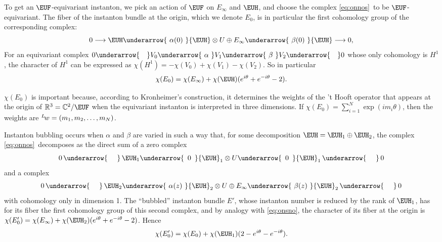 To get an ${\EUF}$-equivariant instanton, we pick an action of
${\EUF}$ on $E_\infty$ and ${{\EUH}}$, and choose the complex
\eqref{eq:onnos}\ to be ${\EUF}$-equivariant. The fiber of the instanton
bundle at the origin, which we denote $E_0$, is in particular the
first cohomology group of the corresponding complex:
\setcounter{equation}{7}
\begin{equation}\label{eq:otonos}
0\longrightarrow{{\EUH}}\underarrow{\,\,\alpha(0)\,\,}{{\EUH}}\otimes
U\oplus E_\infty\underarrow{\,\,\beta(0)\,\,}
{{\EUH}}\longrightarrow 0,
\end{equation}
 For an equivariant complex
$0\underarrow{~~~} V_0\underarrow{\,\,\alpha\,\,}
V_1\underarrow{\,\,\beta\,\,} V_2\underarrow{~~~} 0$ whose only
cohomology is $H^1$, the character of $H^1$ can be expressed as
$\chi(H^1)=-\chi(V_0)+\chi(V_1)-\chi(V_2)$. So in particular
\setcounter{equation}{8}
\begin{equation}\label{eq:onsno}
\chi(E_0)=\chi(E_\infty)+\chi({{\EUH}})(e^{i\theta}+e^{-i\theta}-2).
\end{equation}

$\chi(E_0)$ is important because, according to Kronheimer's
construction, it determines the weights of the 't Hooft operator
that appears at the origin of $\Bbb{R}^3=\Bbb{C}^2/{\EUF}$ when
the equivariant instanton is interpreted in three dimensions. If
$\chi(E_0)=\sum_{i=1}^N\exp({im_i\theta})$, then  the weights are
$^L\negthinspace w=(m_1,m_2,\dots,m_N)$.

Instanton bubbling occurs when $\alpha$ and $\beta $ are varied in
such a way that, for some decomposition ${{\EUH}}={{\EUH}}_1\oplus
{{\EUH}}_2$, the complex \eqref{eq:onnos}\ decomposes as the direct sum of a
zero complex %
\setcounter{equation}{9}
\begin{equation}\label{eq:teto}
0\,\underarrow{~~~~}\,
{{\EUH}}_1\underarrow{\,\,\,0\,\,\,}{{\EUH}}_1\otimes
U\underarrow{\,\,\,0\,\,\,}{{\EUH}}_1\,\underarrow{~~~~}\, 0
\end{equation}
 and
a complex
\setcounter{equation}{10}
\begin{equation}\label{eq:ponos}
0\,\underarrow{~~~~}\,{{\EUH}}_2\underarrow{\,\,\alpha(z)\,\,}{{\EUH}}_2\otimes
U\oplus E_\infty\underarrow{\,\,\beta(z)\,\,}
{{\EUH}}_2\,\underarrow{~~~~}\, 0
\end{equation}
 with cohomology only in
dimension 1. The ``bubbled'' instanton bundle $E'$, whose
instanton number is reduced by the rank of ${{\EUH}}_1$, has for
its fiber the first cohomology group of this second complex, and
by analogy with \eqref{eq:onsno}, the character of its fiber at the origin
is
$\chi(E'_0)=\chi(E_\infty)+\chi({{\EUH}}_2)(e^{i\theta}+e^{-i\theta}-2)$.
Hence
\setcounter{equation}{11}
\begin{equation}\label{eq:ponzo}
\chi(E'_0)=\chi(E_0)+\chi({{\EUH}}_1)(2-e^{i\theta}-e^{-i\theta}).
\end{equation}

